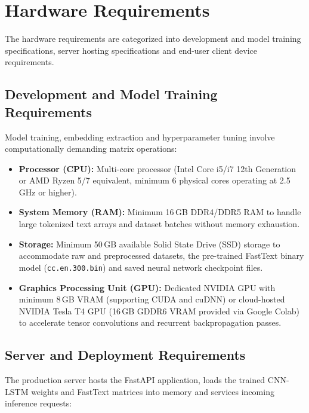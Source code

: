 \documentclass[12pt,a4paper,oneside]{report}
\begin{document}
\section{Hardware Requirements}

The hardware requirements are categorized into development and model training specifications, server
hosting specifications and end-user client device requirements.

\subsection{Development and Model Training Requirements}

Model training, embedding extraction and hyperparameter tuning involve computationally demanding matrix
operations:

\begin{itemize}[leftmargin=*, itemsep=3pt]
  \item \textbf{Processor (CPU):} Multi-core processor (Intel Core i5/i7 12th Generation or AMD
        Ryzen 5/7 equivalent, minimum 6 physical cores operating at 2.5\,GHz or higher).
  \item \textbf{System Memory (RAM):} Minimum 16\,GB DDR4/DDR5 RAM to handle large tokenized text
        arrays and dataset batches without memory exhaustion.
  \item \textbf{Storage:} Minimum 50\,GB available Solid State Drive (SSD) storage to accommodate raw
        and preprocessed datasets, the pre-trained FastText binary model (\texttt{cc.en.300.bin}) and
        saved neural network checkpoint files.
  \item \textbf{Graphics Processing Unit (GPU):} Dedicated NVIDIA GPU with minimum 8\,GB VRAM
        (supporting CUDA and cuDNN) or cloud-hosted NVIDIA Tesla T4 GPU (16\,GB GDDR6 VRAM provided via
        Google Colab) to accelerate tensor convolutions and recurrent backpropagation passes.
\end{itemize}

\subsection{Server and Deployment Requirements}

The production server hosts the FastAPI application, loads the trained CNN-LSTM weights and FastText
matrices into memory and services incoming inference requests:
\end{document}
